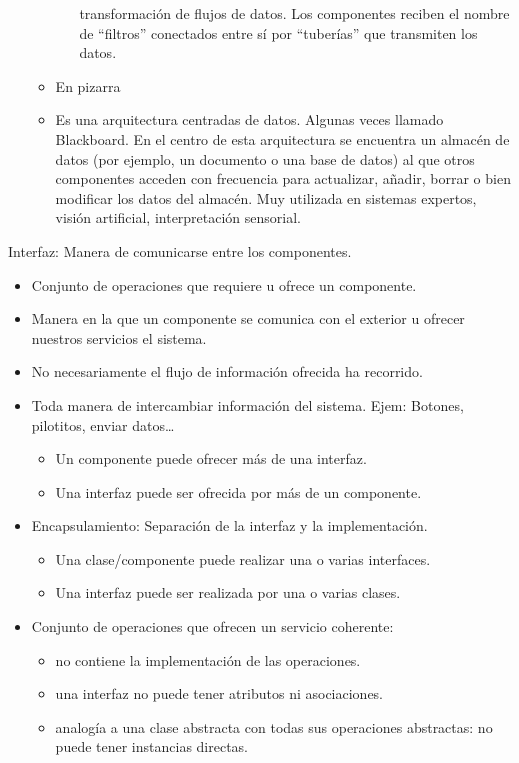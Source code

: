 \documentclass[12pt, twoside, openright]{report} %
\begin{document}
\begin{itemize}
\begin{itemize}
\begin{itemize}
			                  transformación de flujos de datos. Los componentes reciben el
			                  nombre de \enquote{filtros} conectados entre sí por \enquote{tuberías} que
			                  transmiten los datos.
		            \end{itemize}
		      \item En pizarra
		      \item Es una arquitectura centradas de datos. Algunas veces llamado
		            Blackboard. En el centro de esta arquitectura se encuentra un
		            almacén de datos (por ejemplo, un documento o una base de datos)
		            al que otros componentes acceden con frecuencia para actualizar,
		            añadir, borrar o bien modificar los datos del almacén. Muy
		            utilizada en sistemas expertos, visión artificial, interpretación
		            sensorial.
	      \end{itemize}
\end{itemize}

Interfaz: Manera de comunicarse entre los componentes.
\begin{itemize}
	\item Conjunto de operaciones que requiere u ofrece un componente.
	\item Manera en la que un componente se comunica con el exterior u
	      ofrecer nuestros servicios el sistema.
	\item No necesariamente el flujo de información ofrecida ha recorrido.
	      \pagebreak
	\item Toda manera de intercambiar información del sistema. Ejem:
	      Botones, pilotitos, enviar datos\ldots{}
	      \begin{itemize}
		      \item Un componente puede ofrecer más de una interfaz.
		      \item Una interfaz puede ser ofrecida por más de un componente.
	      \end{itemize}
	\item Encapsulamiento: Separación de la interfaz y la implementación.
	      \begin{itemize}
		      \item Una clase/componente puede realizar una o varias interfaces.
		      \item Una interfaz puede ser realizada por una o varias clases.
	      \end{itemize}
	\item Conjunto de operaciones que ofrecen un servicio coherente:
	      \begin{itemize}
		      \item no contiene la implementación de las operaciones.
		      \item una interfaz no puede tener atributos ni asociaciones.
		      \item analogía a una clase abstracta con todas sus operaciones
		            abstractas: no puede tener instancias directas.
	      \end{itemize}
\end{itemize}
\end{document}
